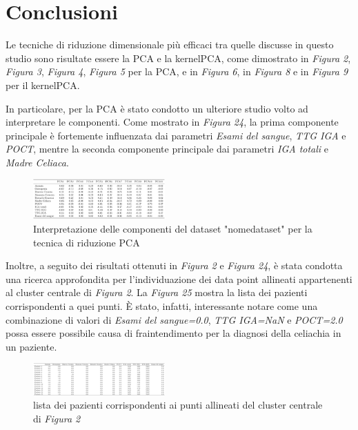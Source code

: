\documentclass[11pt,a4paper,twocolumn]{article}
\begin{document}
\section{Conclusioni}
Le tecniche di riduzione dimensionale più efficaci tra quelle discusse in questo studio sono risultate essere la PCA e la kernelPCA, come dimostrato in \emph{Figura 2}, \emph{Figura 3}, \emph{Figura 4}, \emph{Figura 5} per la PCA, e in \emph{Figura 6}, in \emph{Figura 8} e in \emph{Figura 9} per il kernelPCA. \par

In particolare, per la PCA è stato condotto un ulteriore studio volto ad interpretare le componenti. Come mostrato in \emph{Figura 24}, la prima componente principale è fortemente influenzata dai parametri \emph{Esami del sangue}, \emph{TTG IGA} e \emph{POCT}, mentre la seconda componente principale dai parametri \emph{IGA totali} e \emph{Madre Celiaca}. 

\begin{figure}[H]
	\centering
	\includegraphics[width=0.45\textwidth]{img/PCA_components_interpretation.png}
	\caption{Interpretazione delle componenti del dataset "nomedataset" per la tecnica di riduzione PCA}
\end{figure}

Inoltre, a seguito dei risultati ottenuti in \emph{Figura 2} e \emph{Figura 24}, è stata condotta una ricerca approfondita per l'individuazione dei data point allineati appartenenti al cluster centrale di \emph{Figura 2}. La \emph{Figura 25} mostra la lista dei pazienti corrispondenti a quei punti. È stato, infatti, interessante notare come una combinazione di valori di \emph{Esami del sangue=0.0}, \emph{TTG IGA=NaN} e \emph{POCT=2.0} possa essere possibile causa di fraintendimento per la diagnosi della celiachia in un paziente.

\begin{figure}[H]
	\centering
	\includegraphics[width=0.45\textwidth]{img/pazientiFiltrati.png}
	\caption{lista dei pazienti corrispondenti ai punti allineati del cluster centrale di \emph{Figura 2}}
\end{figure}
\end{document}
